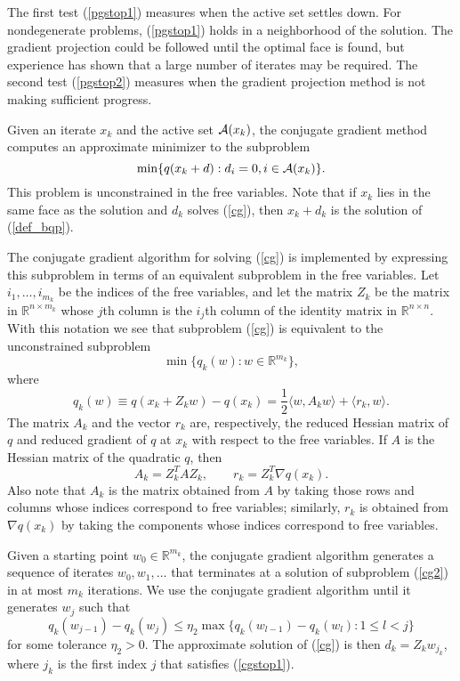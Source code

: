 \documentclass{esub2acm}
\newcommand{\Ref}[1]{\mbox{\rm{(\ref{#1})}}}
\newcommand{\half}{{\textstyle{\frac{1}{2}}}}
\newcommand{\lt}{<}
\newcommand{\R}{\mbox{${\mathbb R}$}}
\begin{document}
The first test (\ref{pgstop1}) measures when the
active set settles down. For nondegenerate problems, 
(\ref{pgstop1}) holds in a neighborhood of the solution.
The gradient
projection could be followed until the optimal face is found, but
experience has shown that a large number of iterates may be required.
The second test (\ref{pgstop2}) measures when
the gradient projection method is not making sufficient progress.

Given an iterate $x_k$ and the active set  ${\cal A}(x_k)$,
the conjugate gradient method computes an approximate
minimizer to the subproblem
\begin{equation} \label{cg}
\min \{ q(x_k + d): d_i = 0, i \in {\cal A}(x_k) \}.
\end{equation}
This problem is unconstrained in the free variables.  Note that
if $x_k$ lies in the same face as the solution and $d_k$ solves
(\ref{cg}), then $x_k + d_k$ is the solution of (\ref{def_bqp}).

The conjugate gradient algorithm for solving
\Ref {cg} is implemented by expressing
this subproblem in terms of an equivalent subproblem in the
free variables.
Let $ i_1, \ldots, i_{m_k} $
be the indices of the free variables, and let
the matrix $Z_k$ be the matrix in $\R^{n \times m_k} $ whose
$j$th column is the $i_j$th column of the identity matrix in
$\R^{n \times n}$. With this notation we see that
subproblem \Ref{cg} is equivalent to the
unconstrained subproblem
\begin{equation}
\min \{ q _ k ( w ) : w \in \R ^ { m_k } \}  ,
\label{cg2}
\end{equation}
where
\[
q_k(w) \equiv q ( x _ k + Z _ k  w ) - q ( x_k ) =
\half \langle w , {A_k} w \rangle + \langle r_k , w \rangle  .
\]
The matrix $ A_k $ and the vector $ r_k $ are, respectively, the
reduced Hessian matrix of $q$ and reduced gradient of $q$ at $x_k$
with respect to the free variables.
If $A$ is the Hessian matrix of the quadratic $q$, then
\[
A_k = Z_k^T A Z_k , \qquad r_k = Z_k^T \nabla q(x_k)  .
\]
Also note that $A_k$ is the matrix obtained from
$A$ by taking those rows and columns whose indices correspond
to free variables;
similarly, $r_k$ is obtained from $\nabla q(x_k)$ by
taking the components whose indices correspond to free variables.

Given a starting point $ w_0 \in \R^{m_k} $, the conjugate gradient algorithm
generates a sequence of iterates $ w _ 0 , w_1 , \ldots $
that terminates at a solution
of subproblem \Ref {cg2} in at most $m_k$ iterations.
We use the conjugate gradient algorithm 
until it generates $ w _ j $ such that
\begin{equation}
q_k ( w_{j-1} ) - q_k ( w _ {j} ) \le \eta_2 \max \{
q_k ( w_{l-1} ) - q_k ( w _ {l} ) : 1 \le l \lt j \}
\label{cgstop1}
\end{equation}
for some tolerance $ \eta_2 > 0 $. 
The approximate 
solution of \Ref {cg} is then
$ d _ k = Z_k w _ {j_k} $, where $j_k$ is the first index $j$
that satisfies \Ref {cgstop1}.
\end{document}
